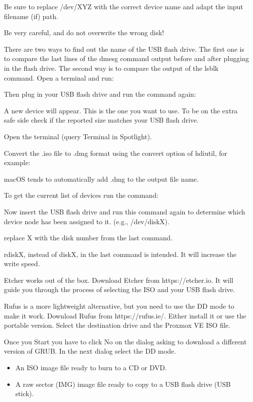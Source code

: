 Be sure to replace /dev/XYZ with the correct device name and adapt the input filename (if) path.

Be very careful, and do not overwrite the wrong disk!

There are two ways to find out the name of the USB flash drive. The first one is to compare the last lines of the dmesg command output before and after plugging in the flash drive. The second way is to compare the output of the lsblk command. Open a terminal and run:

Then plug in your USB flash drive and run the command again:

A new device will appear. This is the one you want to use. To be on the extra safe side check if the reported size matches your USB flash drive.

Open the terminal (query Terminal in Spotlight).

Convert the .iso file to .dmg format using the convert option of hdiutil, for example:

macOS tends to automatically add .dmg to the output file name.

To get the current list of devices run the command:

Now insert the USB flash drive and run this command again to determine which device node has been assigned to it. (e.g., /dev/diskX).

replace X with the disk number from the last command.

rdiskX, instead of diskX, in the last command is intended. It will increase the write speed.

Etcher works out of the box. Download Etcher from https://etcher.io. It will guide you through the process of selecting the ISO and your USB flash drive.

Rufus is a more lightweight alternative, but you need to use the DD mode to make it work. Download Rufus from https://rufus.ie/. Either install it or use the portable version. Select the destination drive and the Proxmox VE ISO file.

Once you Start you have to click No on the dialog asking to download a different version of GRUB. In the next dialog select the DD mode.

\begin{itemize}[leftmargin=2cm]

	\item An ISO image file ready to burn to a CD or DVD.

	\item A raw sector (IMG) image file ready to copy to a USB flash drive (USB stick).

\end{itemize}

